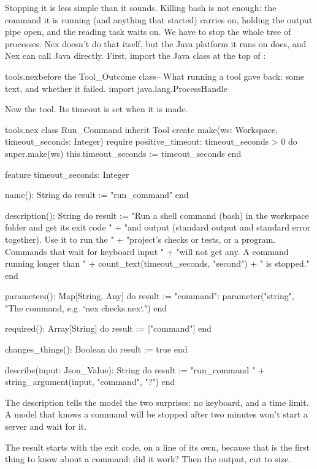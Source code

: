Stopping it is less simple than it sounds. Killing bash is not enough: the
command it is running (and anything that started) carries on, holding the
output pipe open, and the reading task waits on. We have to stop the whole
tree of processes. Nex doesn't do that itself, but the Java platform it
runs on does, and Nex can call Java directly. First, import the Java class
at the top of :

\begin{addbefore}{tools.nex}{before the Tool_Outcome class}{-- What running a tool gave back: some text, and whether it failed.}
import java.lang.ProcessHandle
\end{addbefore}

Now the tool. Its timeout is set when it is made.

\begin{append}{tools.nex}
class Run_Command inherit Tool
create
  make(ws: Workspace, timeout_seconds: Integer)
  require
    positive_timeout: timeout_seconds > 0
  do
    super.make(ws)
    this.timeout_seconds := timeout_seconds
  end

feature
  timeout_seconds: Integer

  name(): String do
    result := "run_command"
  end

  description(): String do
    result := "Run a shell command (bash) in the workspace folder and get its exit code "
      + "and output (standard output and standard error together). Use it to run the "
      + "project's checks or tests, or a program. Commands that wait for keyboard input "
      + "will not get any. A command running longer than "
      + count_text(timeout_seconds, "second") + " is stopped."
  end

  parameters(): Map[String, Any] do
    result := {"command": parameter("string", "The command, e.g. `nex checks.nex`.")}
  end

  required(): Array[String] do
    result := ["command"]
  end

  changes_things(): Boolean do
    result := true
  end

  describe(input: Json_Value): String do
    result := "run_command " + string_argument(input, "command", "?")
  end
\end{append}

The description tells the model the two surprises: no keyboard, and a time
limit. A model that knows a command will be stopped after two minutes
won't start a server and wait for it.

The result starts with the exit code, on a line of its own, because that
is the first thing to know about a command: did it work? Then the output,
cut to size.

